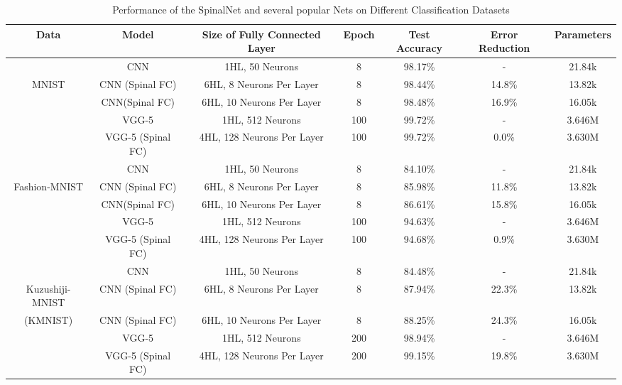\documentclass[journal]{IEEEtran}
\begin{document}
\begin{table*}
\centering
\caption{Performance of the SpinalNet and several popular Nets on Different Classification Datasets}
\label{Perform_tab}
\begin{tabular}{|c|c|c|c|c|c|c|}
\hline
 Data  & Model & Size of Fully Connected Layer & Epoch & Test Accuracy & Error Reduction & Parameters  \\ \hline 

      & CNN\cite{MNIST_CNN}& 1HL, 50 Neurons &8 &98.17\%&- & 21.84k \\ \cline{2-7}
 MNIST  & CNN (Spinal FC) & 6HL, 8 Neurons Per Layer &8 &98.44\%  & 14.8\% &13.82k\\ \cline{2-7}
 \cite{deng2012mnist} & CNN(Spinal FC) & 6HL, 10 Neurons Per Layer &8 &98.48\% &16.9\%&16.05k\\ \cline{2-7}
      
      & VGG-5\cite{VGG5} & 1HL, 512 Neurons &100&99.72\% &- &3.646M\\ \cline{2-7}
      & VGG-5 (Spinal FC) & 4HL, 128 Neurons Per Layer &100&99.72\% &0.0\% &3.630M\\ \hline \hline 
      
        & CNN\cite{MNIST_CNN}& 1HL, 50 Neurons &8 &84.10\%&-& 21.84k \\ \cline{2-7}
 Fashion-MNIST  & CNN (Spinal FC) & 6HL, 8 Neurons Per Layer  &8 &85.98\%  & 11.8\%&13.82k\\ \cline{2-7}
  \cite{xiao2017fashion}    & CNN(Spinal FC) & 6HL, 10 Neurons Per Layer &8 &86.61\% &15.8\%&16.05k\\ \cline{2-7}
     
      & VGG-5\cite{VGG5} & 1HL, 512 Neurons &100&94.63\% &- &3.646M\\ \cline{2-7}
      & VGG-5 (Spinal FC) & 4HL, 128 Neurons Per Layer &100&94.68\% &0.9\% &3.630M\\ \hline  \hline 
      
        & CNN\cite{MNIST_CNN}& 1HL, 50 Neurons &8 &84.48\%&- & 21.84k\\ \cline{2-7}
 Kuzushiji-MNIST  & CNN (Spinal FC) & 6HL, 8 Neurons Per Layer &8 &87.94\%  & 22.3\%&13.82k\\ \cline{2-7}
     (KMNIST) \cite{clanuwat2018deep} & CNN (Spinal FC) & 6HL, 10 Neurons Per Layer &8 &88.25\% &24.3\%&16.05k\\ \cline{2-7}
      
      & VGG-5\cite{VGG5} & 1HL, 512 Neurons &200 &98.94\%&- &3.646M\\ \cline{2-7}
      & VGG-5 (Spinal FC) & 4HL, 128 Neurons Per Layer &200 &99.15\%&19.8\% &3.630M\\ \hline \hline 




\end{tabular}
\end{table*}
\end{document}

